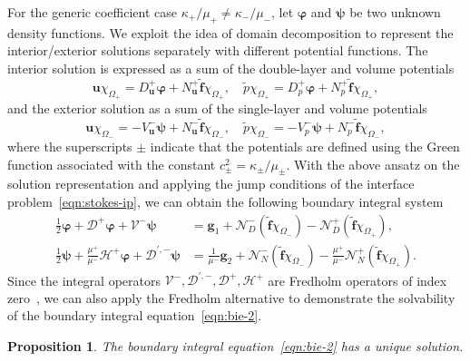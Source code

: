 \documentclass[preprint,11pt]{elsarticle}
\newtheorem{proposition}{Proposition}
\theoremstyle{remark}
\newcommand{\mc}[1]{\mathcal{#1}}
\newcommand{\wt}[1]{\widetilde{#1}}
\newcommand{\bm}[1]{\boldsymbol{#1}}
\newcommand{\vph}{\varphi}
\begin{document}
For the generic coefficient case $\kappa_+/\mu_+ \neq \kappa_-/\mu_-$, let $\bm \vph$ and $\bm \psi$ be two unknown density functions. We exploit the idea of domain decomposition to represent the interior/exterior solutions separately with different potential functions. The interior solution is expressed as a sum of the double-layer and volume potentials
\begin{equation}
    \bm u\chi_{\Omega_+} = D_{\bm u}^+ \bm \vph + N^+_{\bm u} \wt{\bm f}\chi_{\Omega_+},\quad \wt p \chi_{\Omega_+} = D_p^+ \bm \vph + N^+_p \wt{\bm f}\chi_{\Omega_+},
\end{equation}
and the exterior solution as a sum of the single-layer and volume potentials
\begin{equation}
    \bm u\chi_{\Omega_-} = -V_{\bm u}^- \bm \psi + N^-_{\bm u} \wt{\bm f}\chi_{\Omega_-},\quad \wt p \chi_{\Omega_-} = -V_p^- \bm \psi + N^-_p \wt{\bm f}\chi_{\Omega_-},
\end{equation}
where the superscripts $\pm$ indicate that the potentials are defined using the Green function associated with the constant $c_{\pm}^2 = \kappa_\pm / \mu_\pm$.
With the above ansatz on the solution representation and applying the jump conditions of the interface problem~\eqref{eqn:stokes-ip}, we can obtain the following boundary integral system
\begin{subequations}\label{eqn:bie-2}
\begin{align}
    \frac{1}{2} \bm \vph  + \mc{D}^+ \bm \vph  + \mc{V}^-\bm \psi  &= \bm g_1 + \mc{N}_D^-(\wt{\bm{f}}\chi_{\Omega_-}) - \mc{N}_D^+(\wt{\bm{f}}\chi_{\Omega_+}),  \\
    \frac{1}{2}\bm \psi  + \frac{\mu^+}{\mu^-}\mc{H}^+ \bm \vph  + \mc{D}^{\prime,-} \bm \psi  &= \frac{1}{\mu^-}\bm g_2 + \mc N_N^- (\wt{\bm{f}}\chi_{\Omega_-}) - \frac{\mu^+}{\mu^-}\mc N_N^+ (\wt{\bm{f}}\chi_{\Omega_+}).    
\end{align}    
\end{subequations}
Since the integral operators $\mc V^-, \mc D^{\prime,-}, \mc D^+, \mc H^+$ are Fredholm operators of index zero~\cite[Theorem 7.6,7.8]{mclean2000strongly}, we can also apply the Fredholm alternative to demonstrate the solvability of the boundary integral equation~\eqref{eqn:bie-2}. 
\begin{proposition}
    The boundary integral equation~\eqref{eqn:bie-2} has a unique solution.
\end{proposition}
\end{document}
